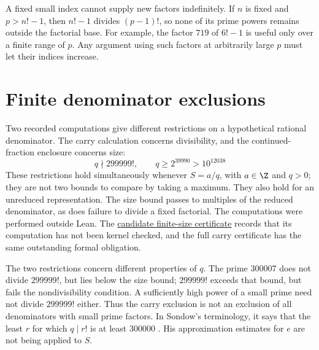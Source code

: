 \label{long68:res:split-factor-normalized-collision}
\label{long68:bdry:fixed-owner-absorption}
A fixed small index cannot supply new factors indefinitely. If $n$ is
fixed and $p>n!-1$, then $n!-1$ divides $(p-1)!$, so none of its prime
powers remains outside the factorial base. For example, the factor $719$
of $6!-1$ is useful only over a finite range of $p$. Any argument using
such factors at arbitrarily large $p$ must let their indices increase.

\section{Finite denominator exclusions}\label{long68:sec:finite}
\label{long68:res:lead-denominator-exclusions}
{}

Two recorded computations give different restrictions on a hypothetical
rational denominator. The carry calculation concerns divisibility, and
the continued-fraction enclosure concerns size:
\begin{equation}\label{long68:eq:finite-bounds}
 q\nmid299999!,\qquad q\ge2^{39990}>10^{12038}
\end{equation}
These restrictions hold simultaneously whenever $S=a/q$, with
$a\in\Z$ and $q>0$; they are not two bounds to compare by taking a
maximum. They also hold for an unreduced representation. The size
bound passes to multiples of the reduced denominator, as does failure
to divide a fixed factorial. The computations were performed outside Lean. The
\href{https://github.com/wcook04/plectis-erdos/blob/27c2fc5fe3c55fe547feaeb4c9bb68b3cf63a5bf/lean/ErdosProblems/Erdos68/PaperCompleteFiniteSizeCertificate.lean#L58}{candidate finite-size certificate}
records that its computation has not been kernel checked, and the full
carry certificate has the same outstanding formal obligation.

The two restrictions concern different properties of $q$. The prime
$300007$ does not divide $299999!$, but lies below the size bound;
$299999!$ exceeds that bound, but fails the nondivisibility condition.
A sufficiently high power of a small prime need not divide $299999!$
either. Thus the carry exclusion is not an exclusion of all denominators
with small prime factors. In Sondow's terminology, it says that the least
$r$ for which $q\mid r!$ is at least $300000$
\cite[\S3, Theorem~1]{sondow2006}. His approximation estimates for $e$
are not being applied to $S$.

